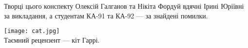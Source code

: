 \newpage
\thispagestyle{empty}
{\Large Творці цього конспекту Олексій Галганов та Нікіта Фордуй вдячні Ірині Юріївні за викладання,
а студентам КА-91 та КА-92 --- за знайдені помилки.}
\begin{center}
    \texttt{[image: cat.jpg]}
    \\
    \vspace{3mm}
    {\Large Таємний рецензент --- кіт Гаррі.}
\end{center}